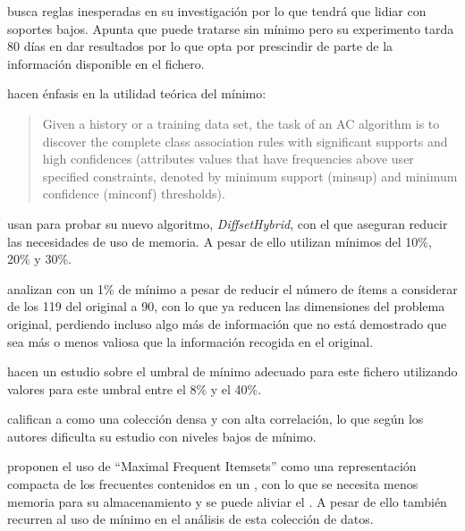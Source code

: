 \citet{Suzuki-DiscoveringInterestingExceptionRulesWithRulePair-2004} busca reglas inesperadas en su investigación por lo que tendrá que lidiar con soportes bajos. Apunta que \mushroom puede tratarse sin \soporte mínimo pero su experimento tarda 80 días en dar resultados por lo que opta por prescindir de parte de la información disponible en el fichero.

\citet{ThabtahCowlingHammoud-ImprovingRuleSorting-2006} hacen énfasis en la utilidad teórica del \soporte mínimo:
\begin{quote}
Given a history or a training data set, the task of an AC algorithm is to discover the complete class association rules with significant supports and high confidences (attributes values that have frequencies above user specified constraints, denoted by minimum support (minsup) and minimum confidence (minconf) thresholds).
\end{quote}

\citet{LuoZhang-AnEfficientFIMAlgorithm-2007} usan \mushroom para probar su nuevo algoritmo, \emph{DiffsetHybrid}, con el que aseguran reducir las necesidades de uso de memoria. A pesar de ello utilizan \soportes mínimos del 10\%, 20\% y 30\%.

\citet{WangXinCoenen-MiningEfficientlySignificantCAR-2008} analizan \mushroom con un 1\% de \soporte mínimo a pesar de reducir el número de ítems a considerar de los 119 del \dataset original a 90, con lo que ya reducen las dimensiones del problema original, perdiendo incluso algo más de información que no está demostrado que sea más o menos valiosa que la información recogida en el \dataset original.

\citet{JinMcCallenBreitbartFuhryWang-EstimatingTheNumberOfFIInLargeDB-2009} hacen un estudio sobre el umbral de \soporte mínimo adecuado para este fichero utilizando valores para este umbral entre el 8\% y el 40\%.

\citet{LiChen-MiningNonDerivableFIOverDataStream-2009} califican a \mushroom como una colección densa y con alta correlación, lo que según los autores dificulta su estudio con niveles bajos de \soporte mínimo.

\citet{LiZhang-MiningMaximalFIOnGraphicsProcessors-2010} proponen el uso de "`Maximal Frequent Itemsets"' como una representación compacta de los \itemsets frecuentes contenidos en un \dataset, con lo que se necesita menos memoria para su almacenamiento y se puede aliviar el \dilemaIR. A pesar de ello también recurren al uso de \soporte mínimo en el análisis de esta colección de datos.


